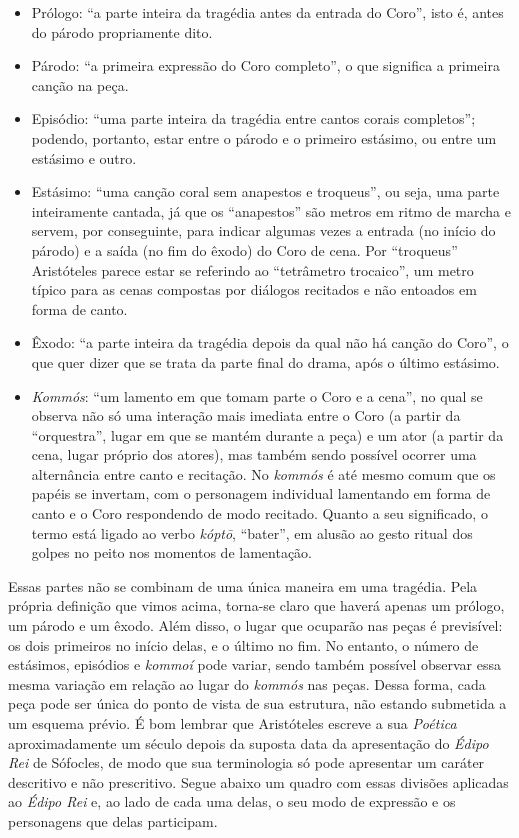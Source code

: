 \begin{itemize}
\item Prólogo: ``a parte inteira da tragédia antes da entrada do
Coro'', isto é, antes do párodo propriamente dito.

\item Párodo: ``a primeira expressão do Coro completo'', o que
significa a primeira canção na peça.

\item Episódio: ``uma parte inteira da tragédia entre cantos corais
completos''; podendo, portanto, estar entre o párodo e o primeiro
estásimo, ou entre um estásimo e outro.

\item Estásimo: ``uma canção coral sem anapestos e troqueus'', ou
seja, uma parte inteiramente cantada, já que os ``anapestos'' são metros
em ritmo de marcha e servem, por conseguinte, para indicar algumas vezes
a entrada (no início do párodo) e a saída (no fim do êxodo) do Coro de
cena. Por ``troqueus'' Aristóteles parece estar se referindo ao
``tetrâmetro trocaico'', um metro típico para as cenas compostas por
diálogos recitados e não entoados em forma de canto.

\item Êxodo: ``a parte inteira da tragédia depois da qual não há
canção do Coro'', o que quer dizer que se trata da parte final do drama,
após o último estásimo.

\item \emph{Kommós}: ``um lamento em que tomam parte o Coro e a
cena'', no qual se observa não só uma interação mais imediata entre o
Coro (a partir da ``orquestra'', lugar em que se mantém durante a peça) e um
ator (a partir da cena, lugar próprio dos atores), mas também sendo
possível ocorrer uma alternância entre canto e recitação. No
\emph{kommós} é até mesmo comum que os papéis se invertam, com o
personagem individual lamentando em forma de canto e o Coro respondendo
de modo recitado. Quanto a seu significado, o termo está ligado ao verbo
\emph{kóptō}, ``bater'', em alusão ao gesto ritual dos golpes no peito
nos momentos de lamentação.
\end{itemize}

Essas partes não se combinam de uma única maneira em uma tragédia. Pela
própria definição que vimos acima, torna-se claro que haverá apenas um
prólogo, um párodo e um êxodo. Além disso, o lugar que ocuparão nas
peças é previsível: os dois primeiros no início delas, e o último no
fim. No entanto, o número de estásimos, episódios e \emph{kommoí} pode
variar, sendo também possível observar essa mesma variação em relação ao
lugar do \emph{kommós} nas peças. Dessa forma, cada peça pode ser única
do ponto de vista de sua estrutura, não estando submetida a um esquema
prévio. É bom lembrar que Aristóteles escreve a sua \emph{Poética}
aproximadamente um século depois da suposta data da apresentação do
\emph{Édipo Rei} de Sófocles, de modo que sua terminologia só pode
apresentar um caráter descritivo e não prescritivo. Segue abaixo um
quadro com essas divisões aplicadas ao \emph{Édipo Rei} e, ao lado de
cada uma delas, o seu modo de expressão e os personagens que delas
participam.


